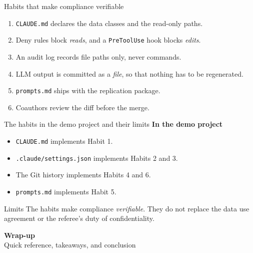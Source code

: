 \documentclass[aspectratio=169,10pt]{beamer}
\begin{document}
\begin{frame}{Habits that make compliance verifiable}
\begin{enumerate}\itemsep9pt
  \item \texttt{CLAUDE.md} declares the data classes and the read-only paths.
  \item Deny rules block \emph{reads}, and a \texttt{PreToolUse} hook blocks \emph{edits}.
  \item An audit log records file paths only, never commands.
  \item LLM output is committed as a \emph{file}, so that nothing has to be regenerated.
  \item \texttt{prompts.md} ships with the replication package.
  \item Coauthors review the diff before the merge.
\end{enumerate}
\end{frame}

\begin{frame}{The habits in the demo project and their limits}
\textbf{In the demo project}
\begin{itemize}\itemsep6pt
  \item \texttt{CLAUDE.md} implements Habit 1.
  \item \texttt{.claude/settings.json} implements Habits 2 and 3.
  \item The Git history implements Habits 4 and 6.
  \item \texttt{prompts.md} implements Habit 5.
\end{itemize}

\vspace{1.0em}
\begin{block}{Limits}
The habits make compliance \emph{verifiable}. They do not replace the data use agreement or the referee's duty of confidentiality.
\end{block}
\end{frame}

\begin{frame}{}
\vfill
\begin{center}
{\Huge \textcolor{uzhblue}{\textbf{Wrap-up}}}\\[12pt]
{\LARGE Quick reference, takeaways, and conclusion}
\end{center}
\vfill
\end{frame}
\end{document}
